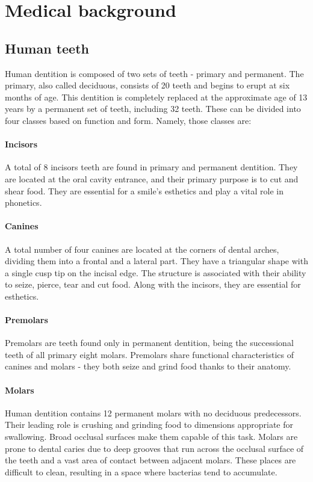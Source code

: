 \chapter{Medical background}
\label{chapter:medical_background}

\section{Human teeth}
Human dentition is composed of two sets of teeth - primary and permanent. The primary, also called deciduous, consists of 20 teeth and begins to erupt at six months of age. This dentition is completely replaced at the approximate age of 13 years by a permanent set of teeth, including 32 teeth. These can be divided into four classes based on function and form. Namely, those classes are:

\subsubsection*{Incisors}
A total of 8 incisors teeth are found in primary and permanent dentition. They are located at the oral cavity entrance, and their primary purpose is to cut and shear food. They are essential for a smile's esthetics and play a vital role in phonetics.

\subsubsection*{Canines}
A total number of four canines are located at the corners of dental arches, dividing them into a frontal and a lateral part. They have a triangular shape with a single cusp tip on the incisal edge. The structure is associated with their ability to seize, pierce, tear and cut food. Along with the incisors, they are essential for esthetics.

\subsubsection*{Premolars}
Premolars are teeth found only in permanent dentition, being the successional teeth of all primary eight molars. Premolars share functional characteristics of canines and molars - they both seize and grind food thanks to their anatomy.

\subsubsection*{Molars}
Human dentition contains 12 permanent molars with no deciduous predecessors. Their leading role is crushing and grinding food to dimensions appropriate for swallowing. Broad occlusal surfaces make them capable of this task. Molars are prone to dental caries due to deep grooves that run across the occlusal surface of the teeth and a vast area of contact between adjacent molars. These places are difficult to clean, resulting in a space where bacterias tend to accumulate.


